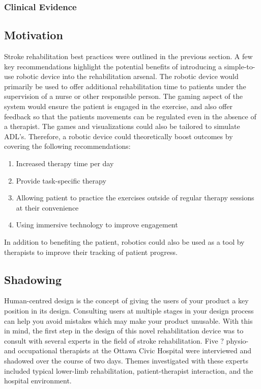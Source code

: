 \documentclass[12pt]{report}
\begin{document}
	\subsubsection{Clinical Evidence}
%
%

	\subsection{Motivation} 
Stroke rehabilitation best practices were outlined in the previous section. A few key recommendations highlight the potential benefits of introducing a simple-to-use robotic device into the rehabilitation arsenal. The robotic device would primarily be used to offer additional rehabilitation time to patients under the supervision of a nurse or other responsible person. The gaming aspect of the system would ensure the patient is engaged in the exercise, and also offer feedback so that the patients movements can be regulated even in the absence of a therapist. The games and visualizations could also be tailored to simulate ADL's. Therefore, a robotic device could theoretically boost outcomes by covering the following recommendations:
\begin{enumerate}
	\item Increased therapy time per day 
	\item Provide task-specific therapy
	\item Allowing patient to practice the exercises outside of regular therapy sessions at their convenience 
	\item Using immersive technology to improve engagement 
\end{enumerate}
In addition to benefiting the patient, robotics could also be used as a tool by therapists to improve their tracking of patient progress. 

	\subsection{Shadowing}
%
	
	
	Human-centred design is the concept of giving the users of your product a key position in its design. Consulting users at multiple stages in your design process can help you avoid mistakes which may make your product unusable. With this in mind, the first step in the design of this novel rehabilitation device was to consult with several experts in the field of stroke rehabilitation. Five ? physio- and occupational therapists at the Ottawa Civic Hospital were interviewed and shadowed over the course of two days. Themes investigated with these experts included typical lower-limb rehabilitation, patient-therapist interaction, and the hospital environment. 
	
\end{document}
